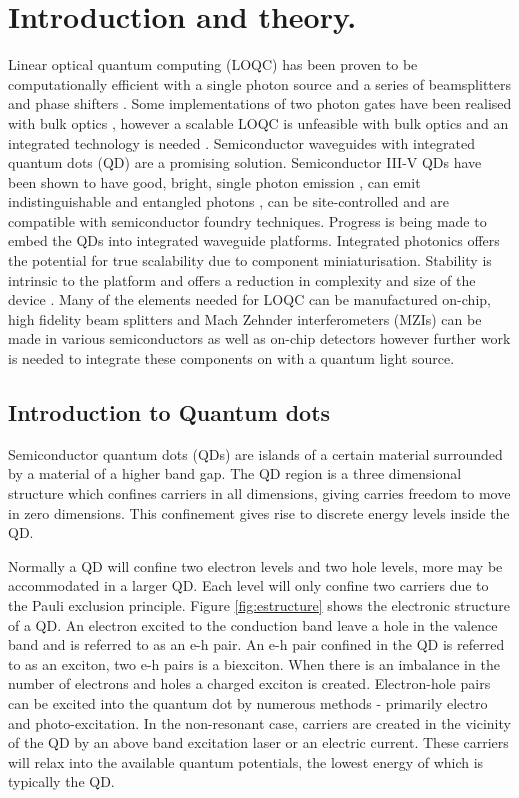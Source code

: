 
  \chapter{Introduction and theory.}

Linear optical quantum computing (LOQC) has been proven to be computationally
efficient with a single photon source and a series of beamsplitters and phase
shifters \cite{knill2001scheme}. Some implementations of two photon gates have
been realised with bulk optics \cite{o2003demonstration}, however a scalable
LOQC is unfeasible with bulk optics and an integrated technology is needed
\cite{carolan2015universal}. Semiconductor waveguides with integrated quantum
dots (QD) are a promising solution. Semiconductor III-V QDs have been shown to
have good, bright, single photon emission \cite{Bennett:05}, can emit
indistinguishable and entangled photons \cite{he2013demand,stevenson2012}, can
be site-controlled \cite{juska2013towards} and are compatible with semiconductor
foundry techniques. Progress is being made to embed the QDs into integrated
waveguide platforms. Integrated photonics offers the potential for true
scalability due to component miniaturisation. Stability is intrinsic to the
platform and offers a reduction in complexity and size of the device
\cite{politi2009integrated}. Many of the elements needed for LOQC can be
manufactured on-chip, high fidelity beam splitters and Mach Zehnder
interferometers (MZIs) can be made in various semiconductors
\cite{wang2014gallium, zhang2011, politi2008silica} as well as on-chip detectors
\cite{gerrits2011chip, hadfield2009single} however further work is needed to
integrate these components on with a quantum light source.

\section{Introduction to Quantum dots}

Semiconductor quantum dots (QDs) are islands of a certain material
surrounded by a material of a higher band gap. The QD region is a three
dimensional structure which confines carriers in all dimensions, giving carries freedom to move in zero dimensions. This
confinement gives rise to discrete energy levels inside the QD.

Normally a QD will confine two electron levels and two hole levels, more may be
accommodated in a larger QD. Each level will only confine two carriers due to the
Pauli exclusion principle. Figure \ref{fig:estructure} shows the electronic
structure of a QD. An electron excited to the conduction band leave a hole in
the valence band and is referred to as an e-h pair. An e-h pair confined in the
QD is referred to as an exciton, two e-h pairs is a biexciton. When there is an
imbalance in the number of electrons and holes a charged exciton is created.
Electron-hole pairs can be excited into the quantum dot by numerous methods -
primarily electro and photo-excitation. In the non-resonant case, carriers are
created in the vicinity of the QD by an above band excitation laser or an
electric current. These carriers will relax into the available quantum
potentials, the lowest energy of which is typically the QD.

